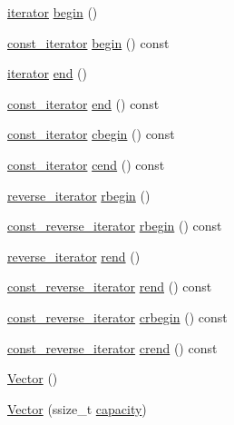 \begin{DoxyCompactItemize}
\item 
\hyperlink{classVector_a45531016f99e90887e0f890f2da943e4}{iterator} \hyperlink{classVector_a466e8c045ea10d62c28b689888e9fe5a}{begin} ()
\item 
\hyperlink{classVector_a484e934cc06bb84c7d70042e792b6e55}{const\+\_\+iterator} \hyperlink{classVector_a514c5f6246f07f0012f1d00912838b19}{begin} () const
\item 
\hyperlink{classVector_a45531016f99e90887e0f890f2da943e4}{iterator} \hyperlink{classVector_ae288fa619188bff101d5300b8aaf9a90}{end} ()
\item 
\hyperlink{classVector_a484e934cc06bb84c7d70042e792b6e55}{const\+\_\+iterator} \hyperlink{classVector_a3f5f39e8ec9f506664b259299e79c485}{end} () const
\item 
\hyperlink{classVector_a484e934cc06bb84c7d70042e792b6e55}{const\+\_\+iterator} \hyperlink{classVector_afa15b0e58a9d29293941b3741a2ed1b5}{cbegin} () const
\item 
\hyperlink{classVector_a484e934cc06bb84c7d70042e792b6e55}{const\+\_\+iterator} \hyperlink{classVector_aab84ab1d529efc8949fb1891fe259f48}{cend} () const
\item 
\hyperlink{classVector_a6afe8339bd8b2187c173c0f46bbd7d63}{reverse\+\_\+iterator} \hyperlink{classVector_a72d1ce8358a966c55da760012fb9a68b}{rbegin} ()
\item 
\hyperlink{classVector_a963c193ac2399eed1cf20d74f559ef2a}{const\+\_\+reverse\+\_\+iterator} \hyperlink{classVector_a0a43fdc1d2f4b49ed085545e6e53a409}{rbegin} () const
\item 
\hyperlink{classVector_a6afe8339bd8b2187c173c0f46bbd7d63}{reverse\+\_\+iterator} \hyperlink{classVector_a74380623d29305cf5c9a544756672ef5}{rend} ()
\item 
\hyperlink{classVector_a963c193ac2399eed1cf20d74f559ef2a}{const\+\_\+reverse\+\_\+iterator} \hyperlink{classVector_a2749110ca7d7260fac6a1725e7fcbed1}{rend} () const
\item 
\hyperlink{classVector_a963c193ac2399eed1cf20d74f559ef2a}{const\+\_\+reverse\+\_\+iterator} \hyperlink{classVector_af5f7e3324c56c546c88099d12820c432}{crbegin} () const
\item 
\hyperlink{classVector_a963c193ac2399eed1cf20d74f559ef2a}{const\+\_\+reverse\+\_\+iterator} \hyperlink{classVector_a2b2998e97102c3750b0b556431b5b6b6}{crend} () const
\item 
\hyperlink{classVector_a39d6069675db4ecfc1ab81d440da759a}{Vector} ()
\item 
\hyperlink{classVector_a2967c34f4076209cb0663428ffd7c54d}{Vector} (ssize\+\_\+t \hyperlink{classVector_a83893154a5d9c5cf0f4f12146371212b}{capacity})

\end{DoxyCompactItemize}
